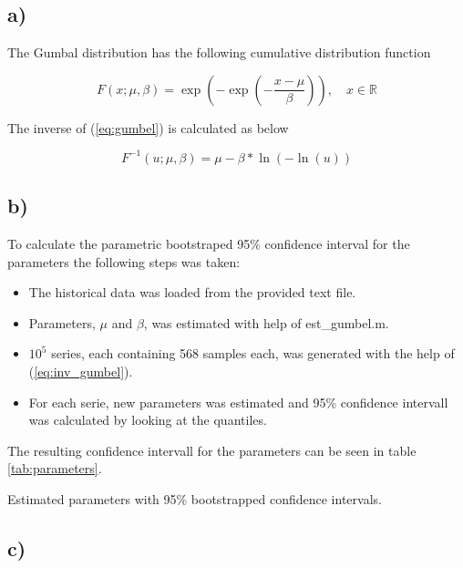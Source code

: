\documentclass[a4paper]{article}
\begin{document}
\subsection*{a)}

The Gumbal distribution has the following cumulative distribution function

\begin{equation}
    F(x; \mu, \beta) = \exp\left(-\exp\left(-\frac{x-\mu}{\beta}\right)\right), \quad x \in \mathbb{R}
    \label{eq:gumbel}
\end{equation}

The inverse of (\ref{eq:gumbel}) is calculated as below

\begin{equation}
    F^{-1}(u; \mu, \beta) = \mu - \beta*\ln(-\ln(u))
    \label{eq:inv_gumbel}
\end{equation}

\subsection*{b)}

To calculate the parametric bootstraped 95\% confidence interval for the parameters the following steps was taken:

\begin{itemize}
    \item The historical data was loaded from the provided text file.
    \item Parameters, $\mu$ and $\beta$, was estimated with help of est\_gumbel.m.
    \item $10^5$ series, each containing 568 samples each, was generated with the help of (\ref{eq:inv_gumbel}).
    \item For each serie, new parameters was estimated and 95\% confidence intervall was calculated by looking at the quantiles.
\end{itemize}

The resulting confidence intervall for the parameters can be seen in table \ref{tab:parameters}.

\begin{table}[H]
    \centering
    \caption{Estimated parameters with 95\% bootstrapped confidence intervals.}
    \label{tab:parameters}
    
\end{table}

\subsection*{c)}
\end{document}
